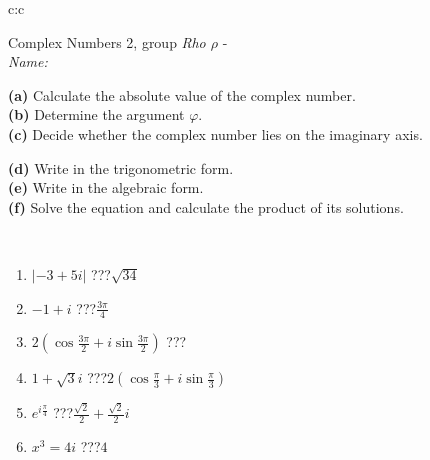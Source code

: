 \documentclass[10pt]{report}
\begin{document}
\newpage
\thispagestyle{empty}
\begin{tabular}{c:c}
\begin{minipage}[c][104.5mm][t]{0.5\linewidth}
\begin{center}
\vspace{5mm}
{\huge Complex Numbers 2, group \textit{Rho $\rho$} -}\\[5mm]
\textit{Name:}\phantom{xxxxxxxxxxxxxxxxxxxxxxxxxxxxxxxxxxxxxxxxxxxxxxxxxxxxxxxxxxxxxxxxx}\\[5mm]
\begin{minipage}{0.95\linewidth}
\begin{center}
{\small \begin{minipage}{0.44\textwidth} \raggedright
\textbf{(a)} Calculate the absolute value of the complex number. \\[1mm]
\textbf{(b)} Determine the argument \(\varphi\). \\[1mm]
\textbf{(c)} Decide whether the complex number lies on the imaginary axis. \end{minipage} \begin{minipage}{0.54\textwidth}
\textbf{(d)} Write in the trigonometric form. \\[1mm]
\textbf{(e)} Write in the algebraic form. \\[1mm]
\textbf{(f)} Solve the equation and calculate the product of its solutions.
\end{minipage}
}
\end{center}
\end{minipage}
\\[1mm]
\begin{minipage}{0.79\linewidth}
\begin{center}
\begin{varwidth}{\linewidth}
\setlength{\itemsep}{0pt}
\begin{enumerate}
\large
\item $|-3+5i|$\quad \dotfill\; ???\;\dotfill \quad $\sqrt{34}$
\item $-1+i$\quad \dotfill\; ???\;\dotfill \quad $\frac{3\pi}{4}$
\item $2\left(\cos{\frac{3\pi}{2}}+i\sin{\frac{3\pi}{2}}\right)$\quad \dotfill\; ???\;\dotfill \quad {}
\item $1+\sqrt{3}i$\quad \dotfill\; ???\;\dotfill \quad $2\left(\cos{\frac{\pi}{3}}+i\sin{\frac{\pi}{3}}\right)$
\item $e^{i\frac{\pi}{4}}$\quad \dotfill\; ???\;\dotfill \quad $\frac{ \sqrt{2}}{2}+\frac{ \sqrt{2}}{2}i$
\item $x^3=4i$\quad \dotfill\; ???\;\dotfill \quad $4$

\end{enumerate}
\end{varwidth}
\end{center}
\end{minipage}
\end{center}
\end{minipage}
\end{tabular}
\end{document}
